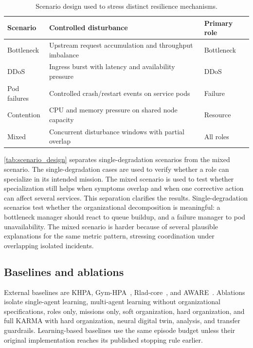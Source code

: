 \documentclass[journal]{IEEEtran}
\begin{document}
\begin{table}[t]
  \centering
  \caption{Scenario design used to stress distinct resilience mechanisms.}
  \label{tab:scenario_design}
  \scriptsize
  \setlength{\tabcolsep}{3pt}
  \renewcommand{\arraystretch}{1.08}
  \begin{tabularx}{\columnwidth}{lXl}
    \toprule
    \textbf{Scenario} & \textbf{Controlled disturbance}                        & \textbf{Primary role} \\
    \midrule
    Bottleneck        & Upstream request accumulation and throughput imbalance & Bottleneck            \\
    DDoS              & Ingress burst with latency and availability pressure   & DDoS                  \\
    Pod failures      & Controlled crash/restart events on service pods        & Failure               \\
    Contention        & CPU and memory pressure on shared node capacity        & Resource              \\
    Mixed             & Concurrent disturbance windows with partial overlap    & All roles             \\
    \bottomrule
  \end{tabularx}
\end{table}

\autoref{tab:scenario_design} separates single-degradation scenarios from the mixed scenario. The single-degradation cases are used to verify whether a role can specialize in its intended mission. The mixed scenario is used to test whether specialization still helps when symptoms overlap and when one corrective action can affect several services.
%
This separation clarifies the results. Single-degradation scenarios test whether the organizational decomposition is meaningful: a bottleneck manager should react to queue buildup, and a failure manager to pod unavailability. The mixed scenario is harder because of several plausible explanations for the same metric pattern, stressing coordination under overlapping isolated incidents.

\subsection{Baselines and ablations}

External baselines are KHPA, Gym-HPA~\cite{gymhpa2022}, Rlad-core~\cite{Rossi2019}, and AWARE~\cite{aware2023}. Ablations isolate single-agent learning, multi-agent learning without organizational specifications, roles only, missions only, soft organization, hard organization, and full KARMA with hard organization, neural digital twin, analysis, and transfer guardrails. Learning-based baselines use the same episode budget unless their original implementation reaches its published stopping rule earlier.
\end{document}
